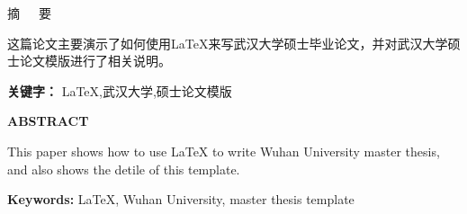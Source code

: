 {
{}

\begin{center}
\heiti{}
摘~~~要
\end{center}

\songti{}
这篇论文主要演示了如何使用\LaTeX 来写武汉大学硕士毕业论文，并对武汉大学硕士论文模版进行了相关说明。

\noindent\heiti{}\textbf{关键字： }
\LaTeX ,武汉大学,硕士论文模版

\cleardoublepage
{}
{}

\begin{center}
\textbf{ABSTRACT}
\end{center}

This paper shows how to use \LaTeX{} to write Wuhan University master thesis, and also shows the detile of
this template.

\noindent\heiti{}\textbf{Keywords: }
\LaTeX, Wuhan University, master thesis template
}
\newpage

